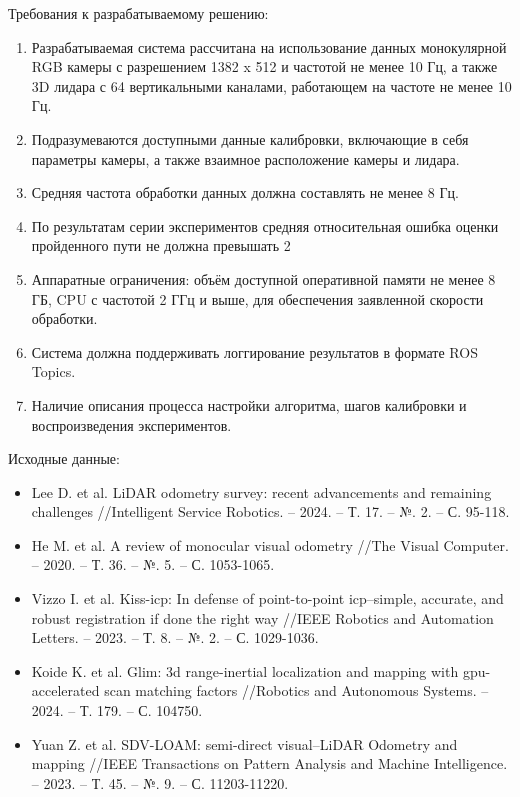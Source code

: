 Требования к разрабатываемому решению:
\begin{enumerate}
  \item Разрабатываемая система рассчитана на использование данных монокулярной RGB камеры с разрешением 1382 x 512 и частотой не менее 10 Гц, а также 3D лидара с 64 вертикальными каналами, работающем на частоте не менее 10 Гц.
  \item Подразумеваются доступными данные калибровки, включающие в себя параметры камеры, а также взаимное расположение камеры и лидара.
  \item Средняя частота обработки данных должна составлять не менее 8 Гц.
  \item По результатам серии экспериментов средняя относительная ошибка оценки пройденного пути не должна превышать 2%
  \item Аппаратные ограничения: объём доступной оперативной памяти не менее 8 ГБ, CPU с частотой 2 ГГц и выше, для обеспечения заявленной скорости обработки.
  \item Система должна поддерживать логгирование результатов в формате ROS Topics.
  \item Наличие описания процесса настройки алгоритма, шагов калибровки и воспроизведения экспериментов.
\end{enumerate}

Исходные данные:
\begin{itemize}
  \item Lee D. et al. LiDAR odometry survey: recent advancements and remaining challenges //Intelligent Service Robotics. – 2024. – Т. 17. – №. 2. – С. 95-118. \cite{lee2024lidar}
  \item He M. et al. A review of monocular visual odometry //The Visual Computer. – 2020. – Т. 36. – №. 5. – С. 1053-1065. \cite{he2020review}
  \item Vizzo I. et al. Kiss-icp: In defense of point-to-point icp–simple, accurate, and robust registration if done the right way //IEEE Robotics and Automation Letters. – 2023. – Т. 8. – №. 2. – С. 1029-1036. \cite{vizzo2023kiss}
  \item Koide K. et al. Glim: 3d range-inertial localization and mapping with gpu-accelerated scan matching factors //Robotics and Autonomous Systems. – 2024. – Т. 179. – С. 104750. \cite{koide2024glim}
  \item Yuan Z. et al. SDV-LOAM: semi-direct visual–LiDAR Odometry and mapping //IEEE Transactions on Pattern Analysis and Machine Intelligence. – 2023. – Т. 45. – №. 9. – С. 11203-11220. \cite{yuan2023sdv}

\end{itemize}

